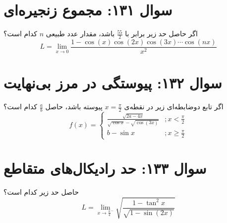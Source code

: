 \documentclass[12pt]{article}
\begin{document}
\section*{سوال ۱۳۱: مجموع زنجیره‌ای}
اگر حاصل حد زیر برابر با \( \frac{55}{2} \) باشد، مقدار عدد طبیعی \(n\) کدام است؟
\begin{displaymath}
	L = \lim_{x \to 0} \frac{1 - \cos(x)\cos(2x)\cos(3x)\cdots\cos(nx)}{x^2}
\end{displaymath}

\vspace{1cm}
\hrulefill
\vspace{1cm}

\section*{سوال ۱۳۲: پیوستگی در مرز بی‌نهایت}
اگر تابع دوضابطه‌ای زیر در نقطه‌ی \(x=\frac{\pi}{2}\) پیوسته باشد، حاصل \( \frac{a}{b} \) کدام است؟
\begin{displaymath}
	f(x)=
	\begin{cases}
		\frac{\sqrt{2a-4x}}{\sqrt{\cos x}-\sqrt{\cos(3x)}} & ; x < \frac{\pi}{2} \\
		b-\sin x & ; x \ge \frac{\pi}{2}
	\end{cases}
\end{displaymath}

\vspace{1cm}
\hrulefill
\vspace{1cm}

\section*{سوال ۱۳۳: حد رادیکال‌های متقاطع}
حاصل حد زیر کدام است؟
\begin{displaymath}
	L = \lim_{x \to \frac{\pi}{4}^-} \sqrt{\frac{1-\tan^2 x}{\sqrt{1-\sin(2x)}}}
\end{displaymath}

\vspace{1cm}
\hrulefill
\vspace{1cm}
\end{document}
